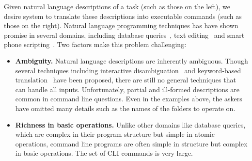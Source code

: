 Given natural language descriptions of a task (such as those on the left), we desire system to translate these descriptions into executable commands (such as those on the right). Natural language programming techniques has have shown promise in several domains, including database queries~\cite{DBLP:journals/pvldb/LiJ14, DBLP:conf/sigmod/GulwaniM14}, text editing~\cite{DBLP:journals/corr/DesaiGHJKMRR15} and smart phone scripting~\cite{DBLP:conf/mobisys/LeGS13}. Two factors make this problem challenging:
\begin{itemize}
\item \textbf{Ambiguity.} Natural language descriptions are inherently ambiguous. Though several techniques including interactive disambiguation~\cite{DBLP:journals/pvldb/LiJ14} and keyword-based translation~\cite{DBLP:conf/sigmod/GulwaniM14} have been proposed, there are still no general techniques that can handle all inputs. Unfortunately, partial and ill-formed descriptions are common in command line questions. Even in the examples above, the askers have omitted many details such as the names of the folders to operate on.
\item \textbf{Richness in basic operations.} Unlike other domains like database queries, which are complex in their program structure but simple in atomic operations, command line programs are often simple in structure but complex in basic operations. The set of CLI commands is very large.
\end{itemize}
